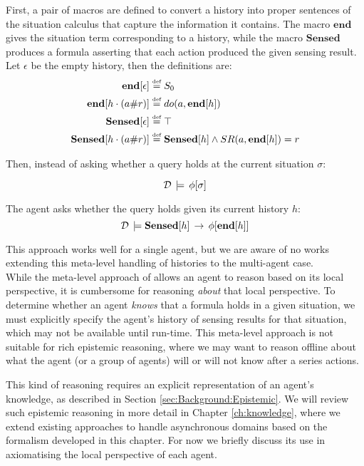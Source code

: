 First, a pair of macros are defined to convert a history into proper
sentences of the situation calculus that capture the information it
contains. The macro $\mathbf{end}$ gives the situation term corresponding
to a history, while the macro $\mathbf{Sensed}$ produces a formula
asserting that each action produced the given sensing result. Let
$\epsilon$ be the empty history, then the definitions are:\begin{alignat*}{1}
\mathbf{end}[\epsilon] & \stackrel{\mbox{\tiny def}}{=} S_{0}\\
\mathbf{end}[h\cdot(a\#r)] & \stackrel{\mbox{\tiny def}}{=} do(a,\mathbf{end}[h])\\
\mathbf{Sensed}[\epsilon] & \stackrel{\mbox{\tiny def}}{=}\top\\
\mathbf{Sensed}[h\cdot(a\#r)] & \stackrel{\mbox{\tiny def}}{=}\mathbf{Sensed}[h]\wedge SR(a,\mathbf{end}[h])=r\end{alignat*}


Then, instead of asking whether a query holds at the current situation
$\sigma$:

\[
\mathcal{D}\,\models\,\phi[\sigma]\]


The agent asks whether the query holds given its current history $h$:\[
\mathcal{D}\,\models\mathbf{Sensed}[h]\,\rightarrow\,\phi[\mathbf{end}[h]]\]


This approach works well for a single agent, but we are aware of no
works extending this meta-level handling of histories to the multi-agent
case.\\


While the meta-level approach of \citep{giacomo99indigolog} allows
an agent to reason based on its local perspective, it is cumbersome
for reasoning \emph{about} that local perspective. To determine whether
an agent \emph{knows} that a formula holds in a given situation, we
must explicitly specify the agent's history of sensing results for
that situation, which may not be available until run-time. This meta-level
approach is not suitable for rich epistemic reasoning, where we may
want to reason offline about what the agent (or a group of agents)
will or will not know after a series actions.

This kind of reasoning requires an explicit representation of an agent's
knowledge, as described in Section \ref{sec:Background:Epistemic}.
We will review such epistemic reasoning in more detail in Chapter
\ref{ch:knowledge}, where we extend existing approaches to handle
asynchronous domains based on the formalism developed in this chapter.
For now we briefly discuss its use in axiomatising the local perspective
of each agent.

